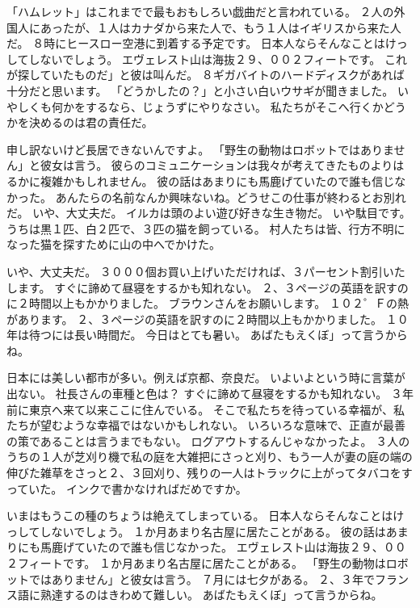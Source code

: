 

「ハムレット」はこれまでで最もおもしろい戯曲だと言われている。 ２人の外国人にあったが、１人はカナダから来た人で、もう１人はイギリスから来た人だ。 ８時にヒースロー空港に到着する予定です。 日本人ならそんなことはけっしてしないでしょう。 エヴェレスト山は海抜２９、００２フィートです。 これが探していたものだ」と彼は叫んだ。 ８ギガバイトのハードディスクがあれば十分だと思います。 「どうかしたの？」と小さい白いウサギが聞きました。 いやしくも何かをするなら、じょうずにやりなさい。 私たちがそこへ行くかどうかを決めるのは君の責任だ。

申し訳ないけど長居できないんですよ。 「野生の動物はロボットではありません」と彼女は言う。 彼らのコミュニケーションは我々が考えてきたものよりはるかに複雑かもしれません。 彼の話はあまりにも馬鹿げていたので誰も信じなかった。 あんたらの名前なんか興味ないね。どうせこの仕事が終わるとお別れだ。 いや、大丈夫だ。 イルカは頭のよい遊び好きな生き物だ。 いや駄目です。 うちは黒１匹、白２匹で、３匹の猫を飼っている。 村人たちは皆、行方不明になった猫を探すために山の中へでかけた。

いや、大丈夫だ。 ３０００個お買い上げいただければ、３パーセント割引いたします。 すぐに諦めて昼寝をするかも知れない。 ２、３ページの英語を訳すのに２時間以上もかかりました。 ブラウンさんをお願いします。 １０２゜Ｆの熱があります。 ２、３ページの英語を訳すのに２時間以上もかかりました。 １０年は待つには長い時間だ。 今日はとても暑い。 あばたもえくぼ」って言うからね。

日本には美しい都市が多い。例えば京都、奈良だ。 いよいよという時に言葉が出ない。 社長さんの車種と色は？ すぐに諦めて昼寝をするかも知れない。 ３年前に東京へ来て以来ここに住んでいる。 そこで私たちを待っている幸福が、私たちが望むような幸福ではないかもしれない。 いろいろな意味で、正直が最善の策であることは言うまでもない。 ログアウトするんじゃなかったよ。 ３人のうちの１人が芝刈り機で私の庭を大雑把にさっと刈り、もう一人が妻の庭の端の伸びた雑草をさっと２、３回刈り、残りの一人はトラックに上がってタバコをすっていた。 インクで書かなければだめですか。

いまはもうこの種のちょうは絶えてしまっている。 日本人ならそんなことはけっしてしないでしょう。 １か月あまり名古屋に居たことがある。 彼の話はあまりにも馬鹿げていたので誰も信じなかった。 エヴェレスト山は海抜２９、００２フィートです。 １か月あまり名古屋に居たことがある。 「野生の動物はロボットではありません」と彼女は言う。 ７月には七夕がある。 ２、３年でフランス語に熟達するのはきわめて難しい。 あばたもえくぼ」って言うからね。



\sectionend

